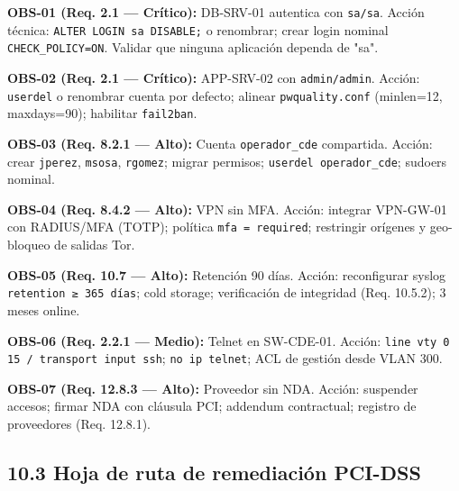 \documentclass[11pt,a4paper]{article}
\begin{document}
\textbf{OBS-01 (Req. 2.1 — Crítico):} DB-SRV-01 autentica con \texttt{sa/sa}. Acción técnica: \texttt{ALTER LOGIN sa DISABLE;} o renombrar; crear login nominal \texttt{CHECK\_POLICY=ON}. Validar que ninguna aplicación dependa de "sa".

\textbf{OBS-02 (Req. 2.1 — Crítico):} APP-SRV-02 con \texttt{admin/admin}. Acción: \texttt{userdel} o renombrar cuenta por defecto; alinear \texttt{pwquality.conf} (minlen=12, maxdays=90); habilitar \texttt{fail2ban}.

\textbf{OBS-03 (Req. 8.2.1 — Alto):} Cuenta \texttt{operador\_cde} compartida. Acción: crear \texttt{jperez}, \texttt{msosa}, \texttt{rgomez}; migrar permisos; \texttt{userdel operador\_cde}; sudoers nominal.

\textbf{OBS-04 (Req. 8.4.2 — Alto):} VPN sin MFA. Acción: integrar VPN-GW-01 con RADIUS/MFA (TOTP); política \texttt{mfa = required}; restringir orígenes y geo-bloqueo de salidas Tor.

\textbf{OBS-05 (Req. 10.7 — Alto):} Retención 90 días. Acción: reconfigurar syslog \texttt{retention ≥ 365 días}; cold storage; verificación de integridad (Req. 10.5.2); 3 meses online.

\textbf{OBS-06 (Req. 2.2.1 — Medio):} Telnet en SW-CDE-01. Acción: \texttt{line vty 0 15 / transport input ssh}; \texttt{no ip telnet}; ACL de gestión desde VLAN 300.

\textbf{OBS-07 (Req. 12.8.3 — Alto):} Proveedor sin NDA. Acción: suspender accesos; firmar NDA con cláusula PCI; addendum contractual; registro de proveedores (Req. 12.8.1).

\subsection{10.3 Hoja de ruta de remediación PCI-DSS}
\end{document}
